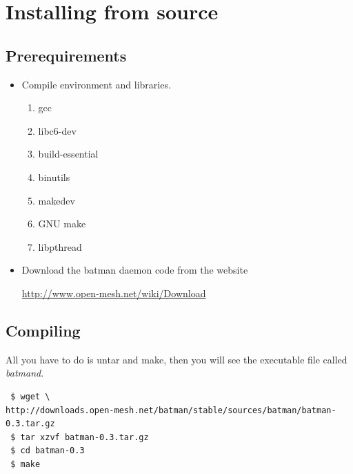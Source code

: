 \documentclass[
	12pt,
	a4paper,
	twoside,
	english,
	headsepline,
	footnosepline,
	automark,
	normalheadings,
	openany,
	cleardoubleplain,
	abstracton,
	idxtotoc,
	liststotoc,
	bibtotoc,
 	BCOR8mm,
]{scrartcl}
\title{\dctitle}
\author{\dcauthorfirstname~\dcauthorlastname}
\begin{document}
\maketitle

\begin{abstract}
 B.A.T.M.A.N stands for ``better approach to mobile ad hoc networking'', this is a new  routing protocol for multi-hop ad-hoc mesh networks. Go to \url{http://www.open-mesh.net} to see  more information.

The following document will explain how to install and use the batman daemon.
\end{abstract}


\section{Installing from source}
\subsection{Prerequirements}

\begin{itemize}
 \item Compile environment and libraries.
       \begin{enumerate}
        \item gcc
        \item libc6-dev
        \item build-essential
        \item binutils
        \item makedev
        \item GNU make
        \item libpthread
       \end{enumerate}
\item Download the batman daemon code from the website

     \url{http://www.open-mesh.net/wiki/Download}
\end{itemize}


\subsection{Compiling}
All you have to do is untar and make, then you will see the executable file called \emph{batmand}.

{\footnotesize
\begin{verbatim}
 $ wget \
http://downloads.open-mesh.net/batman/stable/sources/batman/batman-0.3.tar.gz
 $ tar xzvf batman-0.3.tar.gz
 $ cd batman-0.3
 $ make
\end{verbatim}
}
\end{document}
